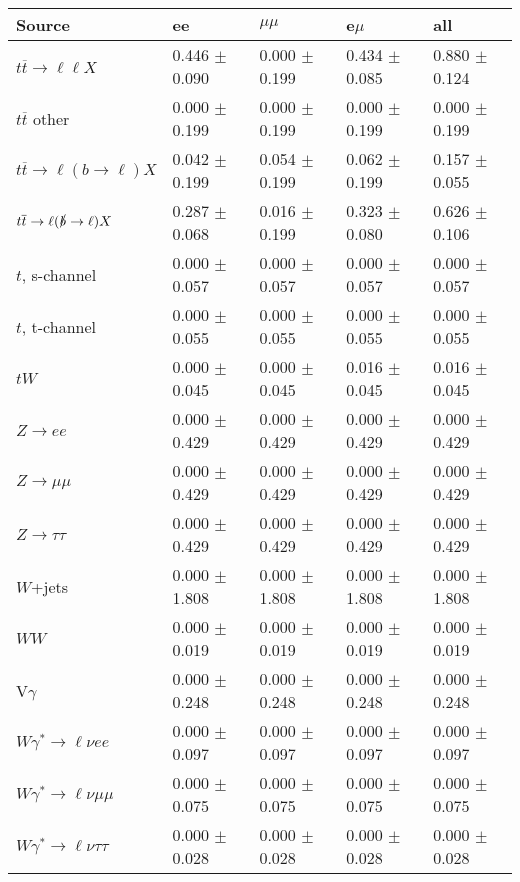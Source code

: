 \begin{tabular}{l | l l l l}
\hline\hline
 Source  &  ee  &  $\mu\mu$  &  e$\mu$  &  all \\
\hline
$t\overline{t}\rightarrow \ell\ell X$ &  0.446 $\pm$  0.090 &  0.000 $\pm$  0.199 &  0.434 $\pm$  0.085 &  0.880 $\pm$  0.124\\
$t\overline{t}$ other &  0.000 $\pm$  0.199 &  0.000 $\pm$  0.199 &  0.000 $\pm$  0.199 &  0.000 $\pm$  0.199\\
$t\overline{t}\rightarrow \ell(b\rightarrow \ell)X$ &  0.042 $\pm$  0.199 &  0.054 $\pm$  0.199 &  0.062 $\pm$  0.199 &  0.157 $\pm$  0.055\\
$t\overline{t}\rightarrow \ell(\slashed{b}\rightarrow \ell)X$ &  0.287 $\pm$  0.068 &  0.016 $\pm$  0.199 &  0.323 $\pm$  0.080 &  0.626 $\pm$  0.106\\
\hline
$t$, s-channel &  0.000 $\pm$  0.057 &  0.000 $\pm$  0.057 &  0.000 $\pm$  0.057 &  0.000 $\pm$  0.057\\
$t$, t-channel &  0.000 $\pm$  0.055 &  0.000 $\pm$  0.055 &  0.000 $\pm$  0.055 &  0.000 $\pm$  0.055\\
$tW$ &  0.000 $\pm$  0.045 &  0.000 $\pm$  0.045 &  0.016 $\pm$  0.045 &  0.016 $\pm$  0.045\\
\hline
$Z\rightarrow ee$ &  0.000 $\pm$  0.429 &  0.000 $\pm$  0.429 &  0.000 $\pm$  0.429 &  0.000 $\pm$  0.429\\
$Z\rightarrow\mu\mu$ &  0.000 $\pm$  0.429 &  0.000 $\pm$  0.429 &  0.000 $\pm$  0.429 &  0.000 $\pm$  0.429\\
$Z\rightarrow\tau\tau$ &  0.000 $\pm$  0.429 &  0.000 $\pm$  0.429 &  0.000 $\pm$  0.429 &  0.000 $\pm$  0.429\\
$W$+jets &  0.000 $\pm$  1.808 &  0.000 $\pm$  1.808 &  0.000 $\pm$  1.808 &  0.000 $\pm$  1.808\\
$WW$ &  0.000 $\pm$  0.019 &  0.000 $\pm$  0.019 &  0.000 $\pm$  0.019 &  0.000 $\pm$  0.019\\
\hline
V$\gamma$ &  0.000 $\pm$  0.248 &  0.000 $\pm$  0.248 &  0.000 $\pm$  0.248 &  0.000 $\pm$  0.248\\
$W\gamma^{*}\rightarrow\ell\nu e e$ &  0.000 $\pm$  0.097 &  0.000 $\pm$  0.097 &  0.000 $\pm$  0.097 &  0.000 $\pm$  0.097\\
$W\gamma^{*}\rightarrow\ell\nu\mu\mu$ &  0.000 $\pm$  0.075 &  0.000 $\pm$  0.075 &  0.000 $\pm$  0.075 &  0.000 $\pm$  0.075\\
$W\gamma^{*}\rightarrow\ell\nu\tau\tau$ &  0.000 $\pm$  0.028 &  0.000 $\pm$  0.028 &  0.000 $\pm$  0.028 &  0.000 $\pm$  0.028\\

\end{tabular}
